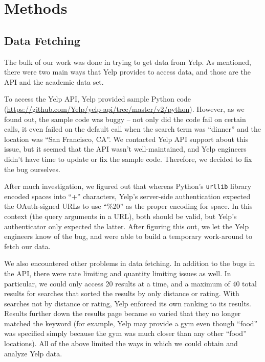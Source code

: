 \documentclass{article}
\begin{document}
\section{Methods}
\label{sec:methods}

\subsection{Data Fetching}

The bulk of our work was done in trying to get data from Yelp. As
mentioned, there were two main ways that Yelp provides to access data, and
those are the API and the academic data set.

To access the Yelp API, Yelp provided sample Python code
(\url{https://github.com/Yelp/yelp-api/tree/master/v2/python}). However, as
we found out, the sample code was buggy -- not only did the code fail on
certain calls, it even failed on the default call when the search term was
``dinner'' and the location was ``San Francisco, CA''. We contacted Yelp
API support about this issue, but it seemed that the API wasn't
well-maintained, and Yelp engineers didn't have time to update or fix the
sample code. Therefore, we decided to fix the bug ourselves.

After much investigation, we figured out that whereas Python's
\texttt{urllib} library encoded spaces into ``+'' characters, Yelp's
server-side authentication expected the OAuth-signed URLs to use ``\%20''
as the proper encoding for space. In this context (the query arguments in a
URL), both should be valid, but Yelp's authenticator only expected the
latter. After figuring this out, we let the Yelp engineers know of the bug,
and were able to build a temporary work-around to fetch our data.

We also encountered other problems in data fetching. In addition to the
bugs in the API, there were rate limiting and quantity limiting issues as
well. In particular, we could only access 20 results at a time, and a
maximum of 40 total results for searches that sorted the results by only
distance or rating. With searches not by distance or rating, Yelp enforced
its own ranking to its results. Results further down the results page
became so varied that they no longer matched the keyword (for example, Yelp
may provide a gym even though ``food'' was specified simply because the gym
was much closer than any other ``food'' locations). All of the above
limited the ways in which we could obtain and analyze Yelp data.
\end{document}
